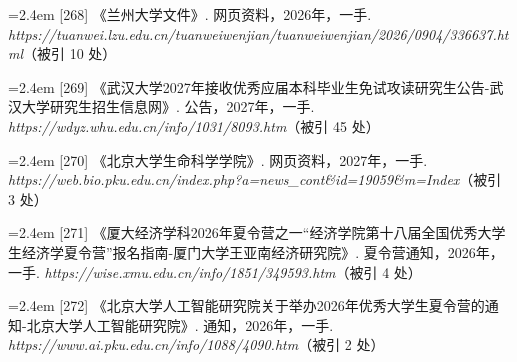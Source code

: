 {\vspace{0.6pt}
\vspace{3.5pt}\par
\nopagebreak\vspace{1pt}
\noindent\hangindent=2.4em \label{src:S0345}{\color{cAccent}[268]} 《兰州大学文件》. 网页资料，2026年，一手. \textit{https://tuanwei.lzu.edu.cn/tuanweiwenjian/tuanweiwenjian/2026/0904/336637.html}（被引 10 处）\par
\vspace{0.6pt}
\vspace{3.5pt}\par
\nopagebreak\vspace{1pt}
\noindent\hangindent=2.4em \label{src:S0347}{\color{cAccent}[269]} 《武汉大学2027年接收优秀应届本科毕业生免试攻读研究生公告-武汉大学研究生招生信息网》. 公告，2027年，一手. \textit{https://wdyz.whu.edu.cn/info/1031/8093.htm}（被引 45 处）\par
\vspace{0.6pt}
\vspace{3.5pt}\par
\nopagebreak\vspace{1pt}
\noindent\hangindent=2.4em \label{src:S0348}{\color{cAccent}[270]} 《北京大学生命科学学院》. 网页资料，2027年，一手. \textit{https://web.bio.pku.edu.cn/index.php?a=news\_cont\&id=19059\&m=Index}（被引 3 处）\par
\vspace{0.6pt}
\vspace{3.5pt}\par
\nopagebreak\vspace{1pt}
\noindent\hangindent=2.4em \label{src:S0349}{\color{cAccent}[271]} 《厦大经济学科2026年夏令营之一“经济学院第十八届全国优秀大学生经济学夏令营”报名指南-厦门大学王亚南经济研究院》. 夏令营通知，2026年，一手. \textit{https://wise.xmu.edu.cn/info/1851/349593.htm}（被引 4 处）\par
\vspace{0.6pt}
\vspace{3.5pt}\par
\nopagebreak\vspace{1pt}
\noindent\hangindent=2.4em \label{src:S0350}{\color{cAccent}[272]} 《北京大学人工智能研究院关于举办2026年优秀大学生夏令营的通知-北京大学人工智能研究院》. 通知，2026年，一手. \textit{https://www.ai.pku.edu.cn/info/1088/4090.htm}（被引 2 处）\par
}
